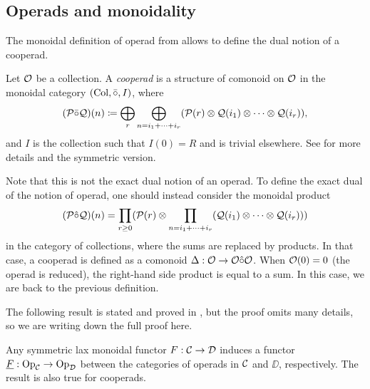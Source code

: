 \documentclass[Thesis.tex]{subfiles}
\begin{document}
\subsection{Operads and monoidality}

The monoidal definition of operad from  allows to define the dual notion of a cooperad.



\begin{defin}
Let ${\mathcal O}$ be a collection. A \emph{cooperad} is a structure of comonoid on ${\mathcal O}$ in the monoidal category $(\mathrm{Col}, \bar{\circ},I)$, where \[(\mathcal{P}\bar{\circ}\mathcal{Q})(n) \coloneqq
\bigoplus_r \bigoplus_{n=i_1+\cdots+i_r}(\mathcal{P}(r)\otimes \mathcal{Q}(i_1)\otimes\cdots\otimes \mathcal{Q}(i_r)),\]
and  $I$ is the collection such that $I(0)=R$ and is trivial elsewhere.
See \cite[\S 5.7.1]{lodayvallette} for more details and the symmetric version.
\end{defin}


Note that this is not the exact dual notion of an operad. To define the exact dual of the notion of operad, one should instead consider
the monoidal product
\[(\mathcal{P}\hat{\circ}\mathcal{Q})(n) =\prod_{r\geq 0}(\mathcal{P}(r)\otimes \prod_{n=i_1+\cdots+i_r}(\mathcal{Q}(i_1)\otimes\cdots\otimes \mathcal{Q}(i_r)))\]
in the category of collections, where the sums are replaced by products. In that case, a cooperad is defined as a comonoid $\Delta:{\mathcal O}\to{\mathcal O}\hat{\circ}{\mathcal O}$.
When ${\mathcal O}(0) = 0$ (the operad is reduced), the right-hand side product is equal to a sum. In this case, we are back to the previous definition.



The following result is stated and proved in \cite[Proposition 3.1.1(a)]{fresse}, but the proof omits many details, so we are writing down the full proof here.
\begin{propo}
Any symmetric lax monoidal functor $F:{\mathcal C}\to{\mathcal D}$ induces a functor $\underline{F}:\mathrm{Op}_{\mathcal C}\to \mathrm{Op}_{\mathcal D}$ between the categories of operads in ${\mathcal C}$ and $\DD$, respectively. The result is also true for cooperads.
\end{propo}
\end{document}
